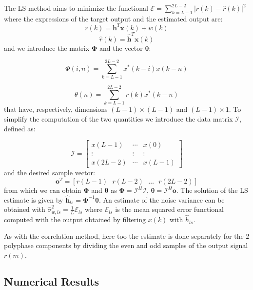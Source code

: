 \documentclass[a4paper,11.5pt]{article}
\newcommand{\vt}{\boldsymbol}
\begin{document}
The LS method aims to minimize the functional $\mathcal{E} = \sum_{k=L-1}^{2L-2}|r(k)-\hat{r}(k)|^2$ where the expressions of the target output and the estimated output are:
\begin{equation}
r(k)=\vt{h}^T\vt{x}(k)+w(k)
\end{equation}
\begin{equation}
\hat{r}(k)=\hat{\vt{h}}^T\vt{x}(k)
\end{equation}
\noindent and we introduce the matrix $\vt{\Phi}$ and the vector $\vt{\theta}$:

\begin{equation}
\Phi (i,n)=\sum_{k=L-1}^{2L-2}x^*(k-i)x(k-n)
\end{equation}

\begin{equation}
\theta (n)=\sum_{k=L-1}^{2L-2}r(k)x^*(k-n)
\end{equation}
\noindent that have, respectively, dimensions $(L-1)\times(L-1)$ and $(L-1)\times 1$. To simplify the computation of the two quantities we introduce the data matrix $\boldsymbol{\mathcal{I}}$, defined as:

\begin{equation}
\vt{\mathcal{I}} =
\begin{bmatrix}
x(L-1)	& \cdots &	x(0) \\
\vdots	& \vdots & \vdots \\
x(2L-2)	& \cdots &	x(L-1)
\end{bmatrix}
\end{equation}
\noindent and the desired sample vector:
\begin{equation}
\vt{o}^T=[r(L-1) \ \ \ r(L-2) \ \ \  \dots \ \ \ r(2L-2)]
\end{equation}
\noindent from which we can obtain $\vt{\Phi}$ and $\vt{\theta}$ as  $\vt{\Phi}=\vt{\mathcal{I}}^H\vt{\mathcal{I}}$, $\vt{\theta}=\vt{\mathcal{I}}^H\vt{o}$. 
The solution of the LS estimate is given by $\hat{\vt{h}}_{ls}=\vt{\Phi}^{-1}\vt{\theta}$. An estimate of the noise variance can be obtained with $\hat{\sigma}_{w,ls}^2=\frac{1}{L}\mathcal{E}_{ls} $ where $\mathcal{E}_{ls}$ is the mean squared error functional computed with the output obtained by filtering $x(k)$ with $\hat{h}_{ls}$.

As with the correlation method, here too the estimate is done separately for the 2 polyphase components by dividing the even and odd samples of the output signal $r(m)$.


\subsection*{Numerical Results}
\end{document}
